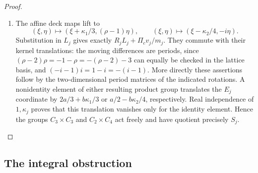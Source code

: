 \begin{proof}
\begin{enumerate}[label=\arabic*.,leftmargin=*]
\item The affine deck maps lift to
\[
 (\xi,\eta)\longmapsto(\xi+\kappa_1/3,(\rho-1)\eta),\qquad
 (\xi,\eta)\longmapsto(\xi-\kappa_2/4,-i\eta).
\]
Substitution in $L_j$ gives exactly $R_jL_j+\Pi_cv_j/m_j$. They commute with their kernel translations: the moving differences are periods, since $(\rho-2)\rho=-1-\rho=-(\rho-2)-3$ can equally be checked in the lattice basis, and $(-i-1)i=1-i=-(i-1)$. More directly these assertions follow by the two-dimensional period matrices of the indicated rotations. A nonidentity element of either resulting product group translates the $E_j$ coordinate by $2a/3+b\kappa_1/3$ or $a/2-b\kappa_2/4$, respectively. Real independence of $1,\kappa_j$ proves that this translation vanishes only for the identity element. Hence the groups $C_3\times C_3$ and $C_2\times C_4$ act freely and have quotient precisely $S_j$.
\end{enumerate}
\end{proof}

\subsection{The integral obstruction}\label{fam:section:A.2}

